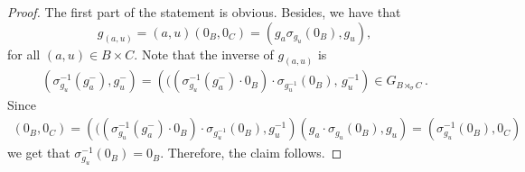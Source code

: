 \documentclass[11pt]{amsart}
\newtheorem{lemma}[theorem]{Lemma}
\theoremstyle{definition}
\begin{document}
\begin{proof}
    The first part of the statement is obvious. Besides, we have that
    $$
    g_{(a,u)} 
    = (a,u)(0_B,0_C) 
    = (g_a \sigma_{g_u}(0_B),g_u),
    $$
    for all $(a,u) \in B \times C$. Note that the inverse of $g_{(a,u)}$ is
    \begin{align*}
        \left(\sigma_{g_u}^{-1}(g_a^{-}), g_u^{-} \right)
        =
        \left( ((\sigma^{-1}_{g_u}(g_a^{-})\cdot 0_B)\cdot\sigma_{g^{-1}_u}(0_B),\, g^{-1}_u \right) \in G_{B \rtimes_\sigma C} \,.
    \end{align*}
    Since
    \begin{align*}
        (0_B,0_C) =
        \left( ((\sigma^{-1}_{g_u}(g_a^{-})\cdot 0_B)\cdot\sigma_{g^{-1}_u}(0_B), g^{-1}_u \right)(g_a\cdot\sigma_{g_u}(0_B), g_u)
        = (\sigma^{-1}_{g_u}(0_B),0_C)
    \end{align*}
    we get that $\sigma^{-1}_{g_u}(0_B)  = 0_B$. 
    Therefore, the claim follows.
\end{proof}

\smallskip
\end{document}
